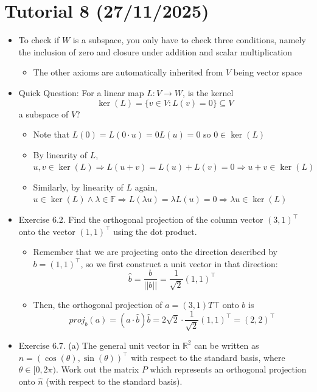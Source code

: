 \documentclass{article}
\begin{document}
\section{Tutorial 8 (27/11/2025)}
\begin{itemize}
    \item To check if $W$ is a subspace, you only have to check three conditions, namely the inclusion of zero and closure under addition and scalar multiplication
    \begin{itemize}
        \item The other axioms are automatically inherited from $V$ being vector space
    \end{itemize}
    \item Quick Question: For a linear map $L: V \rightarrow W$, is the kernel
    \[
    \ker(L) = \{ v \in V : L(v) = 0 \} \subseteq V
    \]
    a subspace of $V$?
    \begin{itemize}
        \item Note that $L(0) = L(0 \cdot u) = 0 L(u) = 0$ so $0 \in \ker(L)$
        \item By linearity of $L$, $u,v \in \ker(L) \Longrightarrow L(u+v) = L(u) + L(v) = 0 \Longrightarrow u+v \in \ker(L)$
        \item Similarly, by linearity of $L$ again, $u \in \ker(L) \wedge \lambda \in \mathbb{F} \Longrightarrow L(\lambda u) = \lambda L(u) = 0 \Longrightarrow \lambda u \in \ker(L)$
    \end{itemize}
    \item Exercise 6.2. Find the orthogonal projection of the column vector $(3,1)^\top$ onto the vector $(1,1)^\top$ using the dot product.
    \begin{itemize}
        \item Remember that we are projecting onto the direction described by $b = (1,1)^\top$, so we first construct a unit vector in that direction:
        \[
        \hat{b} = \frac{b}{\vert \vert b \vert \vert} = \frac{1}{\sqrt{2}} (1,1)^\top
        \]
        \item Then, the orthogonal projection of $a = (3,1)T\top$ onto $b$ is
        \[
        proj_b(a) = (a\cdot\hat{b})\hat{b} = 2\sqrt{2} \cdot \frac{1}{\sqrt{2}}(1,1)^\top = (2,2)^\top
        \]
    \end{itemize}
    \item Exercise 6.7. (a) The general unit vector in $\mathbb{R}^2$ can be written as $\hat{n} = (\cos(\theta),\sin(\theta))^\top$ with respect to the standard basis, where $\theta \in [0,2\pi)$. Work out the matrix $P$ which represents an orthogonal projection onto $\hat{n}$ (with respect to the standard basis).

\end{itemize}
\end{document}
